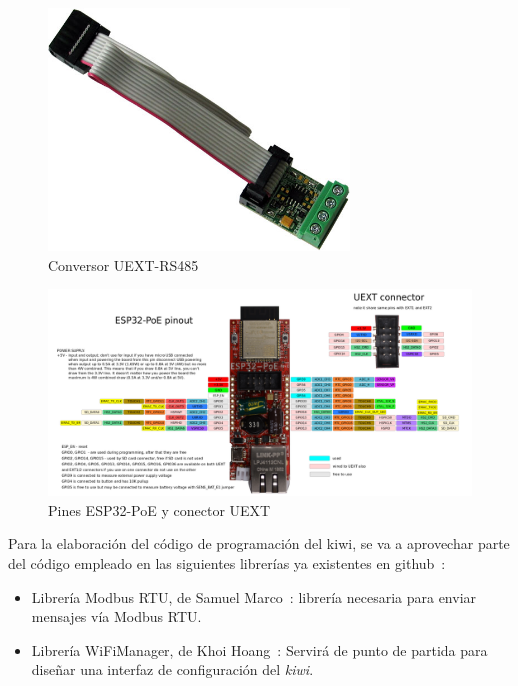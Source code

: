 \begin{figure}[H]
  \centering
  \includegraphics[width=8cm, keepaspectratio]{img/UEXT-RS485}
  \caption{Conversor UEXT-RS485}
  \label{figura:imgconversoruext}
\end{figure}

\hspace{1em}

\begin{figure}[H]
  \centering
  \includegraphics[width=\textwidth, keepaspectratio]{img/ESP32-POE-GPIO}
  \caption{Pines ESP32-PoE y conector UEXT}
  \label{figura:pinesesp32}
\end{figure}

Para la elaboración del código de programación del kiwi, se va a aprovechar parte del código empleado en las siguientes librerías ya existentes en github~\cite{githubWeb}:

\begin{itemize}
  \item Librería Modbus RTU, de Samuel Marco~\cite{libreriaRTUgithub}: librería necesaria para enviar mensajes vía Modbus RTU. 
  \item Librería WiFiManager, de Khoi Hoang~\cite{libreriaWiFigithub}: Servirá de punto de partida para diseñar una interfaz de configuración del \textit{kiwi}.
\end{itemize}

